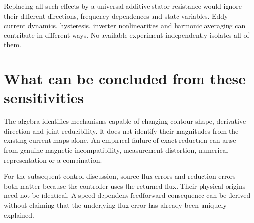 Replacing all such effects by a universal additive stator resistance would ignore their different directions, frequency dependences and state variables. Eddy-current dynamics, hysteresis, inverter nonlinearities and harmonic averaging can contribute in different ways. No available experiment independently isolates all of them.

\section{What can be concluded from these sensitivities}
The algebra identifies mechanisms capable of changing contour shape, derivative direction and joint reducibility. It does not identify their magnitudes from the existing current maps alone. An empirical failure of exact reduction can arise from genuine magnetic incompatibility, measurement distortion, numerical representation or a combination.

For the subsequent control discussion, source-flux errors and reduction errors both matter because the controller uses the returned flux. Their physical origins need not be identical. A speed-dependent feedforward consequence can be derived without claiming that the underlying flux error has already been uniquely explained.
